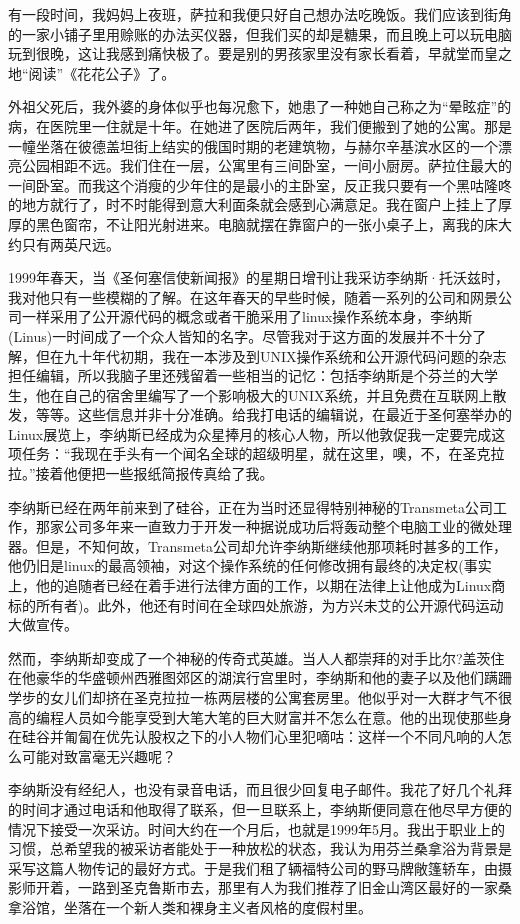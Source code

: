 有一段时间，我妈妈上夜班，萨拉和我便只好自己想办法吃晚饭。我们应该到街角的一家小铺子里用赊账的办法买仪器，但我们买的却是糖果，而且晚上可以玩电脑玩到很晚，这让我感到痛快极了。要是别的男孩家里没有家长看着，早就堂而皇之地“阅读”《花花公子》了。

外祖父死后，我外婆的身体似乎也每况愈下，她患了一种她自己称之为“晕眩症”的病，在医院里一住就是十年。在她进了医院后两年，我们便搬到了她的公寓。那是一幢坐落在彼德盖坦街上结实的俄国时期的老建筑物，与赫尔辛基滨水区的一个漂亮公园相距不远。我们住在一层，公寓里有三间卧室，一间小厨房。萨拉住最大的一间卧室。而我这个消瘦的少年住的是最小的主卧室，反正我只要有一个黑咕隆咚的地方就行了，时不时能得到意大利面条就会感到心满意足。我在窗户上挂上了厚厚的黑色窗帘，不让阳光射进来。电脑就摆在靠窗户的一张小桌子上，离我的床大约只有两英尺远。

 
1999年春天，当《圣何塞信使新闻报》的星期日增刊让我采访李纳斯·托沃兹时，我对他只有一些模糊的了解。在这年春天的早些时候，随着一系列的公司和网景公司一样采用了公开源代码的概念或者干脆采用了linux操作系统本身，李纳斯(Linus)一时间成了一个众人皆知的名字。尽管我对于这方面的发展并不十分了解，但在九十年代初期，我在一本涉及到UNIX操作系统和公开源代码问题的杂志担任编辑，所以我脑子里还残留着一些相当的记忆：包括李纳斯是个芬兰的大学生，他在自己的宿舍里编写了一个影响极大的UNIX系统，并且免费在互联网上散发，等等。这些信息并非十分准确。给我打电话的编辑说，在最近于圣何塞举办的Linux展览上，李纳斯已经成为众星捧月的核心人物，所以他敦促我一定要完成这项任务：“我现在手头有一个闻名全球的超级明星，就在这里，噢，不，在圣克拉拉。”接着他便把一些报纸简报传真给了我。

李纳斯已经在两年前来到了硅谷，正在为当时还显得特别神秘的Transmeta公司工作，那家公司多年来一直致力于开发一种据说成功后将轰动整个电脑工业的微处理器。但是，不知何故，Transmeta公司却允许李纳斯继续他那项耗时甚多的工作，他仍旧是linux的最高领袖，对这个操作系统的任何修改拥有最终的决定权(事实上，他的追随者已经在着手进行法律方面的工作，以期在法律上让他成为Linux商标的所有者)。此外，他还有时间在全球四处旅游，为方兴未艾的公开源代码运动大做宣传。

然而，李纳斯却变成了一个神秘的传奇式英雄。当人人都崇拜的对手比尔?盖茨住在他豪华的华盛顿州西雅图郊区的湖滨行宫里时，李纳斯和他的妻子以及他们蹒跚学步的女儿们却挤在圣克拉拉一栋两层楼的公寓套房里。他似乎对一大群才气不很高的编程人员如今能享受到大笔大笔的巨大财富并不怎么在意。他的出现使那些身在硅谷并匍匐在优先认股权之下的小人物们心里犯嘀咕：这样一个不同凡响的人怎么可能对致富毫无兴趣呢？

李纳斯没有经纪人，也没有录音电话，而且很少回复电子邮件。我花了好几个礼拜的时间才通过电话和他取得了联系，但一旦联系上，李纳斯便同意在他尽早方便的情况下接受一次采访。时间大约在一个月后，也就是1999年5月。我出于职业上的习惯，总希望我的被采访者能处于一种放松的状态，我认为用芬兰桑拿浴为背景是采写这篇人物传记的最好方式。于是我们租了辆福特公司的野马牌敞篷轿车，由摄影师开着，一路到圣克鲁斯市去，那里有人为我们推荐了旧金山湾区最好的一家桑拿浴馆，坐落在一个新人类和裸身主义者风格的度假村里。

